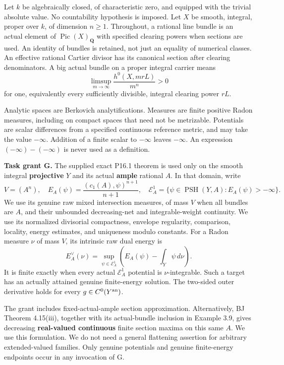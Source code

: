 \documentclass[
  10pt,
]{article}
\begin{document}
Let \(k\) be algebraically closed, of characteristic zero, and equipped
with the trivial absolute value. No countability hypothesis is imposed.
Let \(X\) be smooth, integral, proper over \(k\), of dimension
\(n\geq1\). Throughout, a rational line bundle is an actual element of
\(\operatorname{Pic}(X)_{\mathbf Q}\) with specified clearing powers
when sections are used. An identity of bundles is retained, not just an
equality of numerical classes. An effective rational Cartier divisor has
its canonical section after clearing denominators. A big actual bundle
on a proper integral carrier means \[
 \limsup_{m\to\infty}\frac{h^0(X,mrL)}{m^n}>0
\] for one, equivalently every sufficiently divisible, integral clearing
power \(rL\).

Analytic spaces are Berkovich analytifications. Measures are finite
positive Radon measures, including on compact spaces that need not be
metrizable. Potentials are scalar differences from a specified
continuous reference metric, and may take the value \(-\infty\).
Addition of a finite scalar to \(-\infty\) leaves \(-\infty\). An
expression \((-\infty)-(-\infty)\) is never used as a definition.

\textbf{Task grant G.} The supplied exact P16.1 theorem is used only on
the smooth integral \textbf{projective} \(Y\) and its actual
\textbf{ample} rational \(A\). In that domain, write \[
 V=(A^n),\quad E_A(\psi)=\frac{(c_1(A),\psi)^{n+1}}{n+1},\quad
 \mathcal E^1_A=\{\psi\in\operatorname{PSH}(Y,A):E_A(\psi)>-\infty\}.
\] We use its genuine raw mixed intersection measures, of mass \(V\)
when all bundles are \(A\), and their unbounded decreasing-net and
integrable-weight continuity. We use its normalized divisorial
compactness, envelope regularity, comparison, locality, energy
estimates, and uniqueness modulo constants. For a Radon measure \(\nu\)
of mass \(V\), its intrinsic raw dual energy is \[
 E_A^\vee(\nu)=\sup_{\psi\in\mathcal E^1_A}
   \left(E_A(\psi)-\int_Y\psi\,d\nu\right).
 \tag{1.1}
\] It is finite exactly when every actual \(\mathcal E^1_A\) potential
is \(\nu\)-integrable. Such a target has an actually attained genuine
finite-energy solution. The two-sided outer derivative holds for every
\(g\in C^0(Y^{\rm an})\).

The grant includes fixed-actual-ample section approximation.
Alternatively, BJ Theorem 4.15(iii), together with its actual-bundle
inclusion in Example 3.9, gives decreasing \textbf{real-valued
continuous} finite section maxima on this same \(A\). We use this
formulation. We do not need a general flattening assertion for arbitrary
extended-valued families. Only genuine potentials and genuine
finite-energy endpoints occur in any invocation of G.
\end{document}
